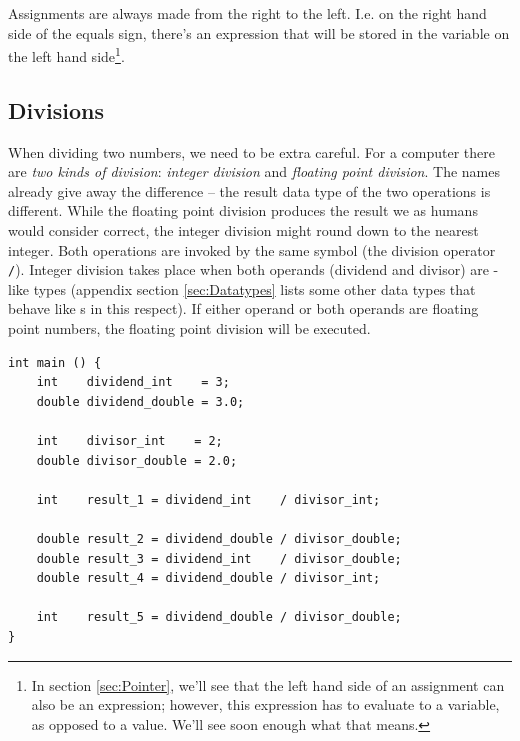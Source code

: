 Assignments are always made from the right to the left. I.\;e. on the right hand side of the equals sign, there's an expression that will be stored in the variable on the left hand side\footnote{In section \ref{sec:Pointer}, we'll see that the left hand side of an assignment can also be an expression; however, this expression has to evaluate to a variable, as opposed to a value. We'll see soon enough what that means.}.

\begin{tcbraster}[raster columns=2,
                  raster equal height,
                  nobeforeafter,
                  raster column skip=0.2cm]
\begin{codebox}
\end{codebox}
%
\begin{warnbox}
\end{warnbox}
\end{tcbraster}


\subsection{Divisions}
When dividing two numbers, we need to be extra careful. For a computer there are \emph{two kinds of division}: \emph{integer division} and \emph{floating point division}. The names already give away the difference -- the result data type of the two operations is different. While the floating point division produces the result we as humans would consider correct, the integer division might round down to the nearest integer. Both operations are invoked by the same symbol (the division operator \texttt{/}). Integer division takes place when both operands (dividend and divisor) are -like types (appendix section \ref{sec:Datatypes} lists some other data types that behave like s in this respect). If either operand or both operands are floating point numbers, the floating point division will be executed.

\begin{codebox}[divisions.c]
\begin{verbatim}
int main () {
    int    dividend_int    = 3;
    double dividend_double = 3.0;
    
    int    divisor_int    = 2;
    double divisor_double = 2.0;

    int    result_1 = dividend_int    / divisor_int;
    
    double result_2 = dividend_double / divisor_double;
    double result_3 = dividend_int    / divisor_double;
    double result_4 = dividend_double / divisor_int;

    int    result_5 = dividend_double / divisor_double;
}
\end{verbatim}
 \label{code:divisions}
\end{codebox}

